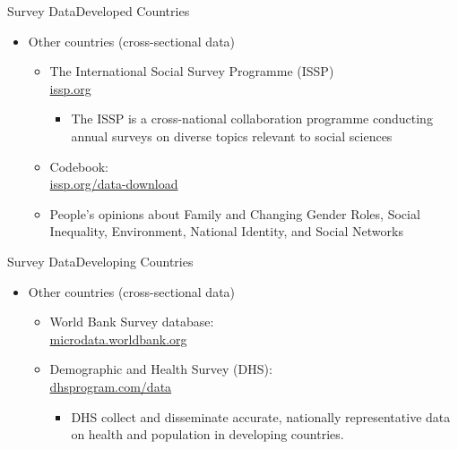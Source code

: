 \documentclass[hyperref={pdfpagelabels=false}]{beamer}
\begin{document}
\begin{frame}{Survey Data}{Developed Countries}
	\begin{itemize} 
		\item Other countries (cross-sectional data)
		\begin{itemize} 
			\vspace{0.3cm}
			\item The International Social Survey Programme
			 (ISSP)  \\ \href{https://issp.org/}{issp.org}
			\begin{itemize}
							\vspace{0.3cm}
				\item The ISSP is a cross-national collaboration programme conducting annual surveys on diverse topics relevant to social sciences
			\end{itemize}
			\vspace{0.3cm}
			\item Codebook:  \\
			
			\href{https://issp.org/data-download/by-topic/}{issp.org/data-download}
			\vspace{0.3cm}
			\item People's opinions about Family and Changing Gender Roles, Social Inequality, Environment, National Identity, and Social Networks
			
		\end{itemize}
		
	\end{itemize}
\end{frame}





\begin{frame}{Survey Data}{Developing Countries}
	\begin{itemize} 
		\item Other countries (cross-sectional data)
		\begin{itemize} 
			\vspace{0.3cm}
			\item World Bank Survey database: \\ 
			\href{https://microdata.worldbank.org/index.php/home}{microdata.worldbank.org}
			\vspace{0.3cm}
			\item Demographic and Health Survey (DHS): \\
			\href{https://dhsprogram.com/data/}{dhsprogram.com/data} 
			\vspace{0.3cm}
			\begin{itemize}
				\item DHS collect and disseminate accurate, nationally representative data on health and population in developing countries.
			\end{itemize}
		\end{itemize}
		
	\end{itemize}
\end{frame}
\end{document}
